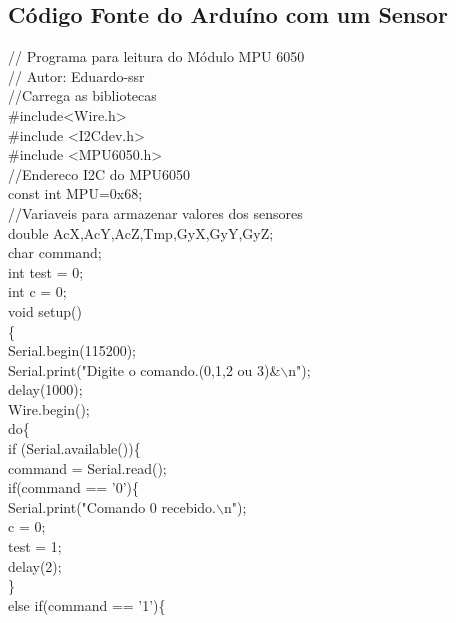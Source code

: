 \begin{apendicesenv}

\partapendices

\chapter{Código Fonte do Arduíno com um Sensor}

// Programa para leitura do Módulo MPU 6050 \\
// Autor: Eduardo-ssr\\

//Carrega as bibliotecas\\
\#include<Wire.h>\\
\#include <I2Cdev.h>\\
\#include <MPU6050.h>\\

//Endereco I2C do MPU6050\\
const int MPU=0x68;  \\

//Variaveis para armazenar valores dos sensores\\
double AcX,AcY,AcZ,Tmp,GyX,GyY,GyZ;\\
char command;\\
int test = 0;\\
int c = 0;\\

void setup()\\
\{\\
Serial.begin(115200);\\
Serial.print("Digite o comando.(0,1,2 ou 3)\&$\backslash$n");\\
delay(1000);\\
Wire.begin();\\
do\{\\
if (Serial.available())\{\\

command = Serial.read();\\

if(command == '0')\{\\  
Serial.print("Comando 0 recebido.$\backslash$n");\\
c = 0;\\
test = 1;\\
delay(2);\\	
\}\\	
else if(command == '1')\{\\


\end{apendicesenv}
